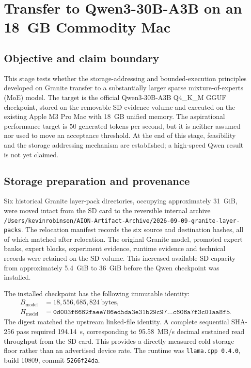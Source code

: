 \section{Transfer to Qwen3-30B-A3B on an 18~GB Commodity Mac}
\label{sec:qwen30b-transfer-2026-09-09}

\subsection{Objective and claim boundary}

This stage tests whether the storage-addressing and bounded-execution principles
developed on Granite transfer to a substantially larger sparse mixture-of-experts
(MoE) model.  The target is the official Qwen3-30B-A3B Q4\_K\_M GGUF checkpoint,
stored on the removable SD evidence volume and executed on the existing Apple M3
Pro Mac with 18~GB unified memory.  The aspirational performance target is
50 generated tokens per second, but it is neither assumed nor used to move an
acceptance threshold.  At the end of this stage, feasibility and the storage
addressing mechanism are established; a high-speed Qwen result is not yet
claimed.

\subsection{Storage preparation and provenance}

Six historical Granite layer-pack directories, occupying approximately 31~GiB,
were moved intact from the SD card to the reversible internal archive
\texttt{/Users/kevinrobinson/AION-Artifact-Archive/2026-09-09-granite-layer-packs}.
The relocation manifest records the six source and destination hashes, all of
which matched after relocation.  The original Granite model, promoted expert
banks, expert blocks, experiment evidence, runtime evidence and technical records
were retained on the SD volume.  This increased available SD capacity from
approximately 5.4~GiB to 36~GiB before the Qwen checkpoint was installed.

The installed checkpoint has the following immutable identity:
\begin{align*}
  B_{\mathrm{model}} &= 18{,}556{,}685{,}824\ \mathrm{bytes},\\
  H_{\mathrm{model}} &= \texttt{0d003f6662faee786ed5da3e31b29c97}\ldots
                       \texttt{c606a7f3c01aa8f5}.
\end{align*}
The digest matched the upstream linked-file identity.  A complete sequential
SHA-256 pass required 194.14~s, corresponding to 95.58~MB/s decimal sustained
read throughput from the SD card.  This provides a directly measured cold
storage floor rather than an advertised device rate.  The runtime was
\texttt{llama.cpp 0.4.0}, build 10809, commit \texttt{5266f24da}.

